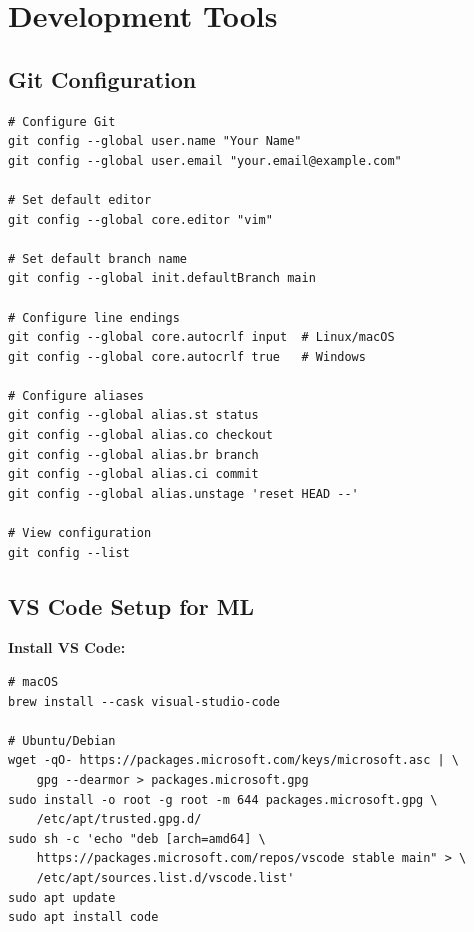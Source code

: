 \section{Development Tools}

\subsection{Git Configuration}

\begin{lstlisting}[style=shell]
# Configure Git
git config --global user.name "Your Name"
git config --global user.email "your.email@example.com"

# Set default editor
git config --global core.editor "vim"

# Set default branch name
git config --global init.defaultBranch main

# Configure line endings
git config --global core.autocrlf input  # Linux/macOS
git config --global core.autocrlf true   # Windows

# Configure aliases
git config --global alias.st status
git config --global alias.co checkout
git config --global alias.br branch
git config --global alias.ci commit
git config --global alias.unstage 'reset HEAD --'

# View configuration
git config --list
\end{lstlisting}

\subsection{VS Code Setup for ML}

\textbf{Install VS Code:}
\begin{lstlisting}[style=shell]
# macOS
brew install --cask visual-studio-code

# Ubuntu/Debian
wget -qO- https://packages.microsoft.com/keys/microsoft.asc | \
    gpg --dearmor > packages.microsoft.gpg
sudo install -o root -g root -m 644 packages.microsoft.gpg \
    /etc/apt/trusted.gpg.d/
sudo sh -c 'echo "deb [arch=amd64] \
    https://packages.microsoft.com/repos/vscode stable main" > \
    /etc/apt/sources.list.d/vscode.list'
sudo apt update
sudo apt install code
\end{lstlisting}

